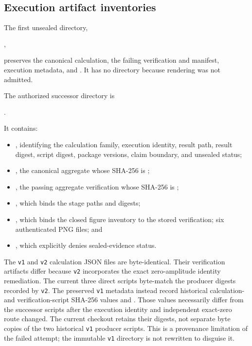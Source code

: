 \subsection{Execution artifact inventories}

The first unsealed directory,
\begin{center}
,
\end{center}
preserves the canonical calculation, the failing verification and manifest, execution
metadata, and .  It has no  directory because rendering
was not admitted.

The authorized successor directory is
\begin{center}
.
\end{center}
It contains:
\begin{itemize}
 \item {}, identifying the calculation family, execution identity,
       result path, result digest, script digest, package versions, claim boundary, and
       unsealed status;
 \item {}, the canonical aggregate whose SHA-256 is
       ;
 \item {}, the passing aggregate verification whose
       SHA-256 is
       ;
 \item {}, which binds the stage paths and digests;
 \item {}, which binds the closed figure inventory to the
       stored verification; six authenticated PNG files; and
 \item {}, which explicitly denies sealed-evidence status.
\end{itemize}
The \texttt{v1} and \texttt{v2} calculation JSON files are byte-identical.  Their
verification artifacts differ because \texttt{v2} incorporates the exact zero-amplitude
identity remediation.  The current three direct scripts byte-match the producer digests
recorded by \texttt{v2}.  The preserved \texttt{v1} metadata instead record historical
calculation- and verification-script SHA-256 values
and
.
Those values necessarily differ from the successor scripts after the execution identity
and independent exact-zero route changed.  The current checkout retains their digests,
not separate byte copies of the two historical \texttt{v1} producer scripts.  This is a
provenance limitation of the failed attempt; the immutable \texttt{v1} directory is not
rewritten to disguise it.

